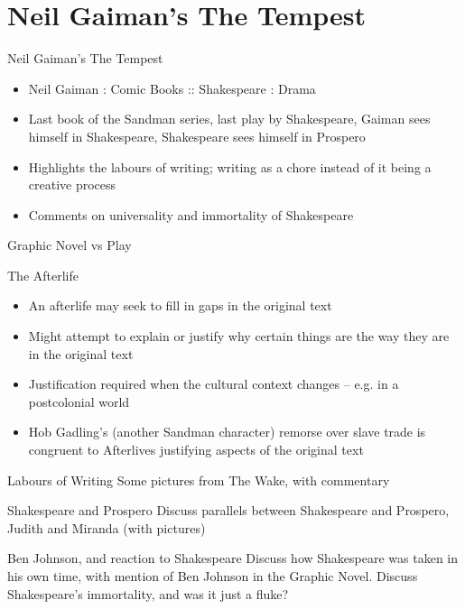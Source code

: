 \documentclass{beamer}
\begin{document}
  \section{Neil Gaiman's The Tempest}
  \begin{frame}{Neil Gaiman's The Tempest}
    \begin{itemize}
      \item Neil Gaiman : Comic Books :: Shakespeare : Drama
      \item Last book of the Sandman series, last play by Shakespeare, Gaiman sees himself in Shakespeare, Shakespeare sees himself in Prospero
      \item Highlights the labours of writing; writing as a chore instead of it being a creative process
      \item Comments on universality and immortality of Shakespeare
    \end{itemize}
  \end{frame}
  
  \begin{frame}{Graphic Novel vs Play}
  \end{frame}
  
  \begin{frame}{The Afterlife}
    \begin{itemize}
  \item An afterlife may seek to fill in gaps in the original text
  \item Might attempt to explain or justify why certain things are the way they are in the original text
  \item Justification required when the cultural context changes -- e.g. in a postcolonial world
  \item Hob Gadling's (another Sandman character) remorse over slave trade is congruent to Afterlives justifying aspects of the original text
    \end{itemize}
  \end{frame}
  
  \begin{frame}{Labours of Writing}
    Some pictures from The Wake, with commentary
  \end{frame}

  \begin{frame}{Shakespeare and Prospero}
    Discuss parallels between Shakespeare and  Prospero, Judith and Miranda (with pictures)
  \end{frame}

  \begin{frame}{Ben Johnson, and reaction to Shakespeare}
    Discuss how Shakespeare was taken in his own time, with mention of Ben Johnson in the Graphic Novel. Discuss Shakespeare's immortality, and was it just a fluke?    
  \end{frame}
  
\end{document}
